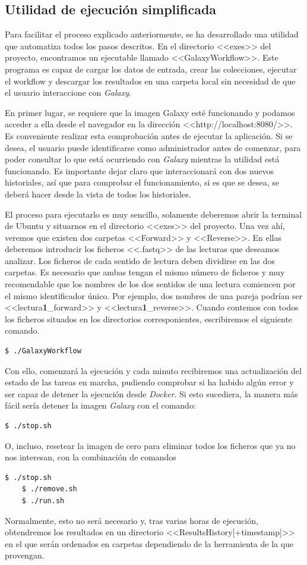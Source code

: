 \subsection{Utilidad de ejecución simplificada}
Para facilitar el proceso explicado anteriormente, se ha desarrollado una utilidad que automatiza todos los pasos descritos. En el directorio <<exes>> del proyecto, encontramos un ejecutable llamado <<GalaxyWorkflow>>. Este programa es capaz de cargar los datos de entrada, crear las colecciones, ejecutar el workflow y descargar los resultados en una carpeta local sin necesidad de que el usuario interaccione con \textit{Galaxy}. 

En primer lugar, se requiere que la imagen Galaxy esté funcionando y podamos acceder a ella desde el navegador en la dirección <<http://localhost:8080/>>. Es conveniente realizar esta comprobación antes de ejecutar la aplicación. Si se desea, el usuario puede identificarse como administrador antes de comenzar, para poder consultar lo que está ocurriendo con \textit{Galaxy} mientras la utilidad está funcionando. Es importante dejar claro que interaccionará con dos nuevos historiales, así que para comprobar el funcionamiento, si es que se desea, se deberá hacer desde la vista de todos los historiales.

El proceso para ejecutarlo es muy sencillo, solamente deberemos abrir la terminal de Ubuntu y situarnos en el directorio <<exes>> del proyecto. Una vez ahí, veremos que existen dos carpetas <<Forward>> y <<Reverse>>. En ellas deberemos introducir los ficheros <<.fastq>> de las lecturas que deseamos analizar. Los ficheros de cada sentido de lectura deben dividirse en las dos carpetas. Es necesario que ambas tengan el mismo número de ficheros y muy recomendable que los nombres de los dos sentidos de una lectura comiencen por el mismo identificador único. Por ejemplo, dos nombres de una pareja podrían ser  <<lectura\textbf{1}\_forward>> y <<lectura\textbf{1}\_reverse>>. Cuando contemos con todos los ficheros situados en los directorios corresponientes, escribiremos el siguiente comando.
\begin{lstlisting}[language=bash]
    $ ./GalaxyWorkflow
\end{lstlisting}
Con ello, comenzará la ejecución y cada minuto recibiremos una actualización del estado de las tareas en marcha, pudiendo comprobar si ha habido algún error y ser capaz de detener la ejecución desde \textit{Docker}. Si esto sucediera, la manera más fácil sería detener la imagen \textit{Galaxy} con el comando:
\begin{lstlisting}[language=bash]
    $ ./stop.sh
\end{lstlisting}
O, incluso, resetear la imagen de cero para eliminar todos los ficheros que ya no nos interesan, con la combinación de comandos
\begin{lstlisting}[language=bash]
    $ ./stop.sh
    $ ./remove.sh
    $ ./run.sh
\end{lstlisting}
Normalmente, esto no será necesario y, tras varias horas de ejecución, obtendremos los resultados en un directorio <<ResultsHistory[+timestamp]>> en el que serán ordenados en carpetas dependiendo de la herramienta de la que provengan.


